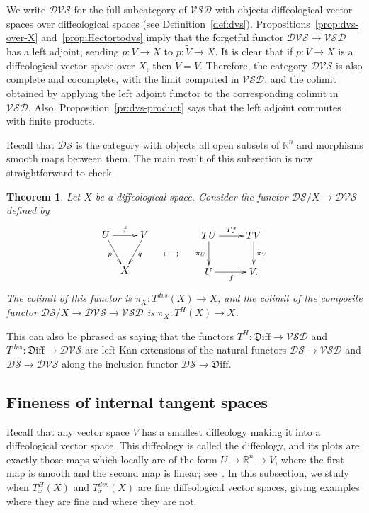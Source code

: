 \documentclass{amsart}
\newcommand{\dfn}[1]{\textbf{\boldmath{#1}}}
\newtheorem{thm}[de]{Theorem}
\theoremstyle{remark}
\newcommand{\ra}{\to}
\newcommand{\Diff}{{\mathfrak{D}\mathrm{iff}}}
\newcommand{\DS}{{\mathcal{DS}}}
\newcommand{\VSD}{{\mathcal{VSD}}}
\newcommand{\DVS}{{\mathcal{DVS}}}
\def \R{\mathbb{R}}
\begin{document}
We write $\DVS$ for the full subcategory of $\VSD$ with objects
diffeological vector spaces over diffeological spaces (see Definition~\ref{def:dvs}).
Propositions~\ref{prop:dvs-over-X} and~\ref{prop:Hectortodvs} imply that
the forgetful functor $\DVS \ra \VSD$ has a left adjoint,
sending $p:V \ra X$ to $p:\tilde{V} \ra X$.
It is clear that if $p:V \ra X$ is a diffeological vector space over $X$,
then $\tilde{V}=V$.
Therefore, the category $\DVS$ is also complete and cocomplete,
with the limit computed in $\VSD$,
and the colimit obtained by applying the left adjoint functor
to the corresponding colimit in $\VSD$.
Also, Proposition~\ref{pr:dvs-product} says that
the left adjoint commutes with finite products.

\medskip

Recall that $\DS$ is the category with objects all open subsets of $\R^n$
and morphisms smooth maps between them.
The main result of this subsection is now straightforward to check.

\begin{thm}\label{thm:dvs-vs-Hector}
Let $X$ be a diffeological space.
Consider the functor $\DS/X \ra \DVS$ defined by
\[
\vcenter{\xymatrix@C5pt@R-5pt{U \ar[dr]_-p \ar[rr]^f & & V \ar[dl]^-q \\ & X_{\strut} }}
\quad\longmapsto\quad
\vcenter{\xymatrix{TU \ar[r]^{Tf} \ar[d]_{\pi_U} & TV \ar[d]^{\pi_V} \\ U \ar[r]_f & V.}}
\]
The colimit of this functor is $\pi_X: T^{dvs}(X) \ra X$,
and the colimit of the composite functor $\DS/X \ra \DVS \ra \VSD$
is $\pi_X:T^H(X) \ra X$.
\end{thm}

This can also be phrased as saying that
the functors $T^H:\Diff \ra \VSD$ and $T^{dvs}:\Diff \ra \DVS$ are
left Kan extensions of the natural functors
$\DS \ra \VSD$ and $\DS \ra \DVS$
along the inclusion functor $\DS \to \Diff$.

\subsection{Fineness of internal tangent spaces}\label{ss:fine}

Recall that any vector space $V$ has a smallest diffeology making it into a
diffeological vector space.
This diffeology is called the \dfn{fine} diffeology,
and its plots are exactly those maps which locally are of the
form $U \to \R^n \to V$, where the first map is smooth and the
second map is linear; see~\cite[Chapter~3]{I3}.
In this subsection, we study when $T^H_x(X)$ and $T^{dvs}_x(X)$ are
fine diffeological vector spaces, giving examples where they are
fine and where they are not.
\end{document}
